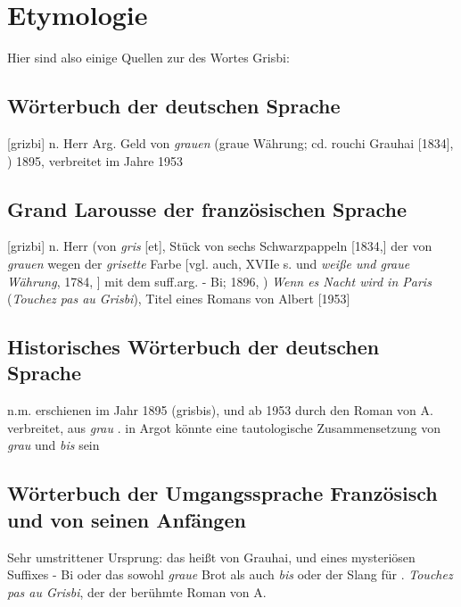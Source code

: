 \section{Etymologie\label{preamble-etymology}}

Hier sind also einige Quellen zur  des Wortes Grisbi:

\subsection*{Wörterbuch der deutschen Sprache}
[grizbi] n. Herr Arg. Geld von \emph{grauen} (graue Währung; cd. rouchi Grauhai [1834], ) 1895, verbreitet im Jahre 1953

\subsection*{Grand Larousse der französischen Sprache}
[grizbi] n. Herr (von \emph{gris} [et], Stück von sechs Schwarzpappeln [1834,] der von \emph{grauen} wegen der \emph{grisette} Farbe [vgl. auch,  XVIIe s. und \emph{weiße und graue Währung}, 1784, ] mit dem suff.arg. - Bi; 1896, )
\emph{Wenn es Nacht wird in Paris} (\emph{Touchez pas au Grisbi}), Titel eines Romans von Albert  [1953]

\subsection*{Historisches Wörterbuch der deutschen Sprache}
n.m. erschienen im Jahr 1895 (grisbis), und ab 1953 durch den Roman von A.  verbreitet, aus \emph{grau} .  in Argot könnte eine tautologische Zusammensetzung von \emph{grau} und \emph{bis} sein

\subsection*{Wörterbuch der Umgangssprache Französisch und von seinen Anfängen}
Sehr umstrittener Ursprung: das heißt von Grauhai,  und eines mysteriösen Suffixes - Bi oder das sowohl \emph{graue} Brot als auch \emph{bis} oder der Slang für . \emph{Touchez pas au Grisbi}, der der berühmte Roman von A. 

